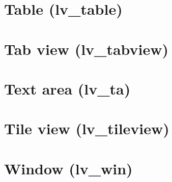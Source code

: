 \documentclass[letterpaper,10pt,english]{sphinxmanual}
\begin{document}
\begin{sphinxVerbatim}[commandchars=\\\{\}]
    
    
\end{sphinxVerbatim}


\section{Table (lv\_table)}
\label{\detokenize{object-types/table:table-lv-table}}\label{\detokenize{object-types/table::doc}}

\section{Tab view (lv\_tabview)}
\label{\detokenize{object-types/tabview:tab-view-lv-tabview}}\label{\detokenize{object-types/tabview::doc}}

\section{Text area (lv\_ta)}
\label{\detokenize{object-types/ta:text-area-lv-ta}}\label{\detokenize{object-types/ta::doc}}

\section{Tile view (lv\_tileview)}
\label{\detokenize{object-types/tileview:tile-view-lv-tileview}}\label{\detokenize{object-types/tileview::doc}}

\section{Window (lv\_win)}
\label{\detokenize{object-types/win:window-lv-win}}\label{\detokenize{object-types/win::doc}}


\renewcommand{\indexname}{Index}
\printindex
\end{document}
